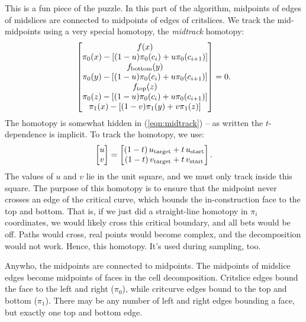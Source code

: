This is a fun piece of the puzzle.  In this part of the algorithm, midpoints of edges of midslices are connected to midpoints of edges of critslices.  We track the mid-midpoints using a very special homotopy, the {\em midtrack} homotopy:
\begin{equation}
\begin{bmatrix}
f(x) \\
\pi_0(x) - [(1-u) \pi_{0}(c_i) + u \pi_{0}(c_{i+1})] \\
f_{\textnormal{bottom}}(y) \\
\pi_0(y) - [(1-u) \pi_{0}(c_i) + u \pi_{0}(c_{i+1})] \\
f_{\textnormal{top}}(z) \\
\pi_0(z) - [(1-u) \pi_{0}(c_i) + u \pi_{0}(c_{i+1})] \\
\pi_1(x) - [(1-v)\pi_1(y) + v \pi_1(z)]
\end{bmatrix} = 0. \label{eqn:midtrack}
\end{equation}
%
The homotopy is somewhat hidden in (\ref{eqn:midtrack}) -- as written the $t$-dependence is implicit.  To track the homotopy, we use:
\begin{equation}
\begin{bmatrix}
u \\ v \end{bmatrix}
=
\begin{bmatrix}
(1-t) \,u_{\textnormal{target}} + t \, u_{\textnormal{start}} \\
(1-t) \, v_{\textnormal{target}} + t \, v_{\textnormal{start}}
\end{bmatrix}.
\end{equation}
The values of $u$ and $v$ lie in the unit square, and we must only track inside this square.  The purpose of this homotopy is to ensure that the midpoint never crosses an edge of the critical curve, which bounds the in-construction face to the top and bottom.  That is, if we just did a straight-line homotopy in $\pi_i$ coordinates, we would likely cross this critical boundary, and all bets would be off.  Paths would cross, real points would become complex, and the decomposition would not work.  Hence, this homotopy.  It's used during sampling, too.

Anywho, the midpoints are connected to midpoints.  The midpoints of midslice edges become midpoints of faces in the cell decomposition.  Critslice edges bound the face to the left and right ($\pi_0$), while critcurve edges bound to the top and bottom ($\pi_1$).  There may be any number of left and right edges bounding a face, but exactly one top and bottom edge.    


